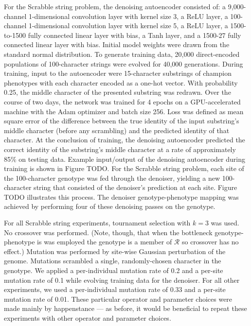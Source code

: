 For the Scrabble string problem, the denoising autoencoder consisted of: a 9,000-channel 1-dimensional convolution layer with kernel size 3, a ReLU layer, a 100-channel 1-dimensional convolution layer with kernel size 5, a ReLU layer, a 1500-to-1500 fully connected linear layer with bias, a Tanh layer, and a 1500-27 fully connected linear layer with bias.
Initial model weights were drawn from the standard normal distribution.
To generate training data, 20,000 direct-encoded populations of 100-character strings were evolved for 40,000 generations.
During training, input to the autoencoder were 15-character substrings of champion phenotypes with each character encoded as a one-hot vector.
With probability 0.25, the middle character of the presented substring was redrawn.
Over the course of two days, the network was trained for 4 epochs on a GPU-accelerated machine with the Adam optimizer and batch size 256.
Loss was defined as mean square error of the difference between the true identity of the input substring's middle character (before any scrambling) and the predicted identity of that character.
At the conclusion of training, the denoising autoencoder predicted the correct identity of the substring's middle character at a rate of approximately 85\% on testing data.
Example input/output of the denoising autoencoder during training is shown in Figure TODO.
For the Scrabble string problem, each site of the 100-character genotype was fed through the denoiser, yielding a new 100-character string that consisted of the denoiser's prediction at each site.
Figure TODO illustrates this process.
The denoiser genotype-phenotype mapping was achieved by performing four of these denoising passes on the genotype.

For all Scrabble string experiments, tournament selection with $k = 3$ was used.
No crossover was performed.
(Note, though, that when the bottleneck genotype-phenotype is was employed the genotype is a member of $\mathcal{R}$ so crossover has no effect.)
Mutation was performed by site-wise Gaussian perturbation of the genome.
Mutations scrambled a single, randomly-chosen character in the genotype.
We applied a per-individual mutation rate of 0.2 and a per-site mutation rate of 0.1 while evolving training data for the denoiser.
For all other experiments, we used a per-individual mutation rate of 0.33 and a per-site mutation rate of 0.01.
These particular operator and parameter choices were made mainly by happenstance --- as before, it would be beneficial to repeat these experiments with other operator and parameter choices.

